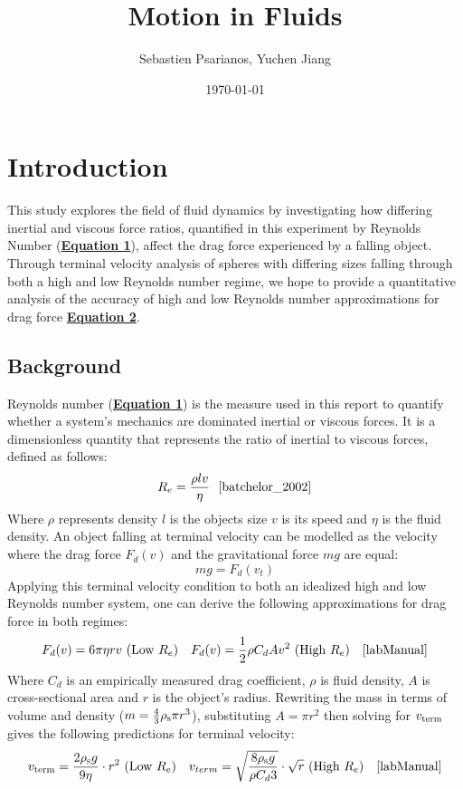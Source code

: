 \documentclass[
	letterpaper
	12pt
]{template}
\newcommand{\bref}[2]{\textbf{\hyperref[#1]{#2}}}
\begin{document}
\title{Motion in Fluids}

\author{Sebastien Psarianos, Yuchen Jiang}

\date{\today}
\maketitle
\section{Introduction}
This study explores the field of fluid dynamics by investigating how differing inertial and viscous force ratios, quantified in this experiment by Reynolds Number (\bref{eqn::reynolds}{Equation 1}), affect the drag force experienced by a falling object. Through terminal velocity analysis of spheres with differing sizes falling through both a high and low Reynolds number regime, we hope to provide a quantitative analysis of the accuracy of high and low Reynolds number approximations for drag force \bref{eqn::dragForce}{Equation 2}.

\subsection{Background}
Reynolds number (\bref{reynolds}{Equation 1}) is the measure used in this report to quantify whether a system's mechanics are dominated inertial or viscous forces. It is a dimensionless quantity that represents the ratio of inertial to viscous forces, defined as follows:
\begin{equation}\label{eqn::reynolds}
	R_e = \frac{\rho l v}{\eta}\ \ \text{\cite{batchelor_2002}}
\end{equation}
Where $\rho$ represents density $l$ is the objects size $v$ is its speed and $\eta$ is the fluid density. An object falling at terminal velocity can be modelled as the velocity where the drag force $F_d(v)$ and the gravitational force $mg$ are equal:
\[mg = F_d(v_{t})\]
Applying this terminal velocity condition to both an idealized high and low Reynolds number system, one can derive the following approximations for drag force in both regimes:
\begin{align}\label{eqn::dragForce}
	F_d(v) = 6\pi\eta r v \text{ (Low $R_e$)} && F_d(v) = {1\over 2}\rho C_dAv^2 \text{ (High $R_e$)} && \cite{labManual}
\end{align}
Where $C_d$ is an empirically measured drag coefficient, $\rho$ is fluid density, $A$ is cross-sectional area and $r$ is the object's radius. Rewriting the mass in terms of volume and density ($m =  {4\over 3}\rho_{\rm s}\pi r^3$), substituting $A=\pi r^2$ then solving for $v_{\rm term}$ gives the following predictions for terminal velocity:
\begin{align}\label{eqn::terminalVelocity}
	v_{\rm term}  = {2\rho_{\rm s} g\over 9 \eta}\cdot r^2 \text{ (Low $R_e$)} && 	v_{term} =\sqrt{8\rho_{\rm s} g\over \rho C_d  3}\cdot \sqrt{r} \text{ (High $R_e$)}
	&& \cite{labManual}
\end{align}
\end{document}
